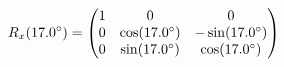 \documentclass[preview]{standalone}
\begin{document}
\begin{align*}
\special{dvisvgm:raw <g id='unique000'>}R_x(17.0^\circ) = \begin{pmatrix} 1 & 0 & 0 \\ 0 & \cos(17.0^\circ) & -\sin(17.0^\circ) \\ 0 & \sin(17.0^\circ) & \cos(17.0^\circ) \end{pmatrix}\special{dvisvgm:raw </g>}
\end{align*}
\end{document}
